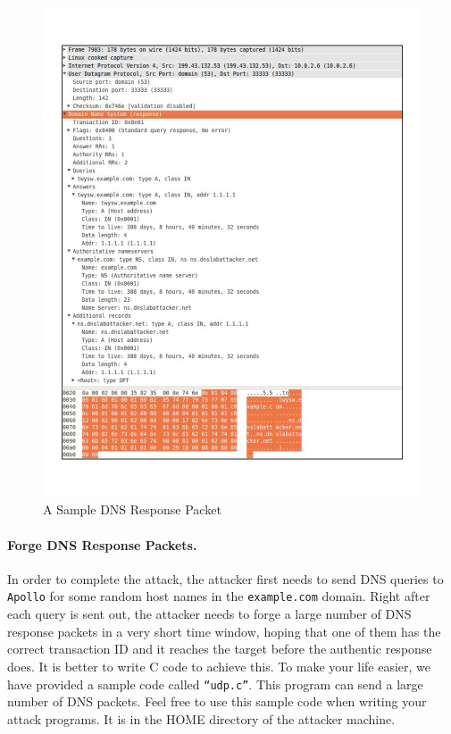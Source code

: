 \begin{figure}[H]
\centering
\includegraphics*[viewport=0 50 600 750,width=1.0\textwidth]{Figs/screenshot_packet.pdf}
\caption{A Sample DNS Response Packet}
\label{fig:response_packet}
\end{figure}



\paragraph{Forge DNS Response Packets.}
In order to complete the attack, the attacker first needs to send 
DNS queries to {\tt Apollo} for some random host names in
the {\tt example.com} domain. Right after each query is sent out, 
the attacker needs to forge a large number of DNS response packets in a
very short time window,
hoping that one of them has the correct transaction ID and it reaches the target before 
the authentic response does. It is better to write C code to achieve this. 
To make your life easier, we have provided a sample code called {\tt “udp.c”}. 
This program can send a large number of DNS packets. Feel free to 
use this sample code when writing your attack programs. It is in the HOME directory
of the attacker machine.

